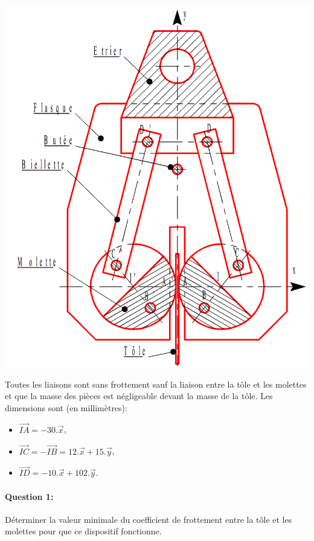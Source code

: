 \begin{center}
 \includegraphics[width=0.6\linewidth]{img/porte_tole.png}
\end{center}

Toutes les liaisons sont sans frottement sauf la liaison entre la tôle et les molettes et que la masse des pièces est négligeable devant la masse de la tôle. Les dimensions sont (en millimètres):
\begin{itemize}
 \item $\overrightarrow{IA}=-30.\overrightarrow{x}$,
 \item $\overrightarrow{IC}=-\overrightarrow{IB}=12.\overrightarrow{x}+15.\overrightarrow{y}$,
 \item $\overrightarrow{ID}=-10.\overrightarrow{x}+102.\overrightarrow{y}$.
\end{itemize}

\paragraph{Question 1:} Déterminer la valeur minimale du coefficient de frottement entre la tôle et les molettes pour que ce dispositif fonctionne.

\newpage

~\

